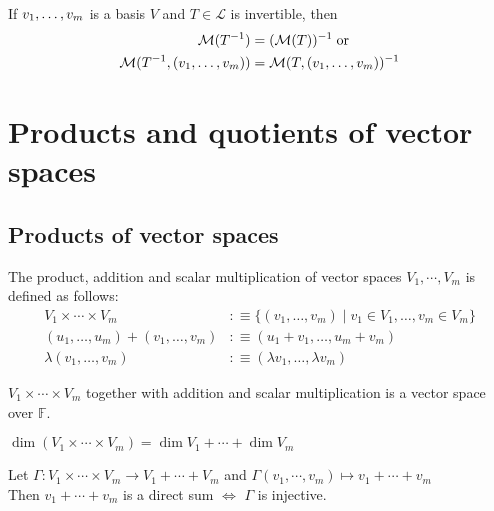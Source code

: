 \setcounter{thm}{85}
\begin{thm}
    If $v_1, \dots, v_m$ is a basis $V$ and $T\in \mathcal{L}$ is invertible, then 
    \begin{equation}
    	\begin{aligned}
    		\mathcal{M}(T^{-1}) & = (\mathcal{M}(T))^{-1} \; \text{or} \\
    		\mathcal{M}(T^{-1}, (v_1, \dots, v_m)) & =\mathcal{M}(T, (v_1, \dots, v_m))^{-1}
    	\end{aligned}
    \end{equation}
\end{thm}

\filbreak
\section{Products and quotients of vector spaces}
\subsection{Products of vector spaces}

\begin{mydef}The product, addition and scalar multiplication of vector spaces $V_1, \cdots, V_m$ is defined as follows:
    \begin{equation}
	\begin{aligned}
		V_1 \times \cdots \times V_m &:\equiv \{ (v_1, \dots, v_m) \mid v_1 \in V_1, \dots, v_m \in V_m\} \\
		(u_1, \dots, u_m) + (v_1, \dots, v_m) &:\equiv (u_1+v_1, \dots, u_m+v_m) \\
		\lambda (v_1, \dots, v_m) &:\equiv (\lambda v_1, \dots, \lambda v_m)			
	\end{aligned}
\end{equation}
\end{mydef}

\setcounter{thm}{88}
\begin{thm}
    $V_1 \times \cdots \times V_m$ together with addition and scalar multiplication is a vector space over $\mathbb{F}$.
\end{thm}

\setcounter{thm}{91}
\begin{thm}
    $\dim (V_1 \times \cdots \times V_m) = \dim V_1 + \cdots + \dim V_m$
\end{thm}

\begin{thm}
    Let $\Gamma: V_1 \times \cdots \times V_m \to V_1 + \cdots + V_m$ and
    $ \Gamma(v_1, \cdots, v_m) \mapsto v_1 + \cdots + v_m$ \\
Then $v_1 + \cdots + v_m$ is a direct sum $\iff$ $\Gamma$ is injective. 
\end{thm}

